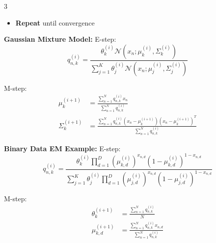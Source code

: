 \documentclass[10pt,landscape]{article}
\begin{document}
\begin{multicols}{3}
\begin{tcolorbox}[breakable, title=Expectation-Maximization (EM) Algorithm, colback=em, boxsep=1pt, left=1pt, right=1pt, top=1pt, bottom=1pt]
\begin{itemize}[leftmargin=*,noitemsep,topsep=0pt]
    For mixture weights:
    \begin{equation}
    \theta_k^{(i+1)} = \frac{\sum_{n=1}^N q_{n,k}^{(i)}}{N}
    \end{equation}
    
    For component parameters:
    \begin{equation}
    \pi_k^{(i+1)} = \underset{\pi_k}{\arg\max} \sum_{n=1}^N q_{n,k}^{(i)} \log p(x_n|z_n = C_k, \pi_k)
    \end{equation}
    
    \item \textbf{Repeat} until convergence
\end{itemize}

\textbf{Gaussian Mixture Model:}
E-step:
\begin{equation}
q_{n,k}^{(i)} = \frac{\theta_k^{(i)} \mathcal{N}(x_n; \mu_k^{(i)}, \Sigma_k^{(i)})}{\sum_{j=1}^K \theta_j^{(i)} \mathcal{N}(x_n; \mu_j^{(i)}, \Sigma_j^{(i)})}
\end{equation}

M-step:
\begin{align}
\mu_k^{(i+1)} &= \frac{\sum_{n=1}^N q_{n,k}^{(i)}x_n}{\sum_{n=1}^N q_{n,k}^{(i)}}\\
\Sigma_k^{(i+1)} &= \frac{\sum_{n=1}^N q_{n,k}^{(i)}(x_n - \mu_k^{(i+1)})(x_n - \mu_k^{(i+1)})^T}{\sum_{n=1}^N q_{n,k}^{(i)}}
\end{align}

\textbf{Binary Data EM Example:}
E-step:
\begin{equation}
q_{n,k}^{(i)} = \frac{\theta_k^{(i)} \prod_{d=1}^D (\mu_{k,d}^{(i)})^{x_{n,d}} (1-\mu_{k,d}^{(i)})^{1-x_{n,d}}}{\sum_{j=1}^K \theta_j^{(i)} \prod_{d=1}^D (\mu_{j,d}^{(i)})^{x_{n,d}} (1-\mu_{j,d}^{(i)})^{1-x_{n,d}}}
\end{equation}

M-step:
\begin{align}
\theta_k^{(i+1)} &= \frac{\sum_{n=1}^N q_{n,k}^{(i)}}{N}\\
\mu_{k,d}^{(i+1)} &= \frac{\sum_{n=1}^N q_{n,k}^{(i)}x_{n,d}}{\sum_{n=1}^N q_{n,k}^{(i)}}
\end{align}
\end{tcolorbox}


\end{multicols}
\end{document}

